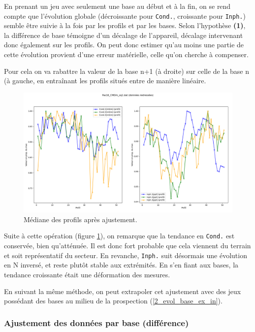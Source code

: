 \documentclass[12pt]{article}
\begin{document}
    En prenant un jeu avec seulement une base au début et à la fin, on se rend compte que l'évolution globale (décroissante pour \texttt{Cond.}, croissante pour \texttt{Inph.}) semble être suivie à la fois par les profils et par les bases. Selon l'hypothèse \textbf{(1)}, la différence de base témoigne d'un décalage de l'appareil, décalage intervenant donc également sur les profils. On peut donc estimer qu'au moins une partie de cette évolution provient d'une erreur matérielle, celle qu'on cherche à compenser.

    Pour cela on va rabattre la valeur de la base n+1 (à droite) sur celle de la base n (à gauche, en entraînant les profils situés entre de manière linéaire.

    \begin{figure}[ht!]
        \centering
        \includegraphics[width=\textwidth]{Images/Base_Apres_sq2.png}  
        \caption{Médiane des profils après ajustement.}
        \label{fig:2_evol_base_im}
    \end{figure}

    Suite à cette opération (figure \ref{fig:2_evol_base_im}), on remarque que la tendance en \texttt{Cond.} est conservée, bien qu'atténuée. Il est donc fort probable que cela viennent du terrain et soit représentatif du secteur. En revanche, \texttt{Inph.} suit désormais une évolution en N inversé, et reste plutôt stable aux extrémités. En s'en fiant aux bases, la tendance croissante était une déformation des mesures.

    \label{2_evol_base_ex_out} En suivant la même méthode, on peut extrapoler cet ajustement avec des jeux possédant des bases au milieu de la prospection (\ref{2_evol_base_ex_in}).

\newpage
\subsubsection{Ajustement des données par base (différence)}
\end{document}
